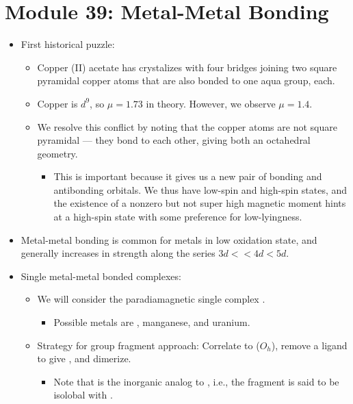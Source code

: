 \documentclass[../notes.tex]{subfiles}
\begin{document}
\section{Module 39: Metal-Metal Bonding}
\begin{itemize}
    \item First historical puzzle:
    \begin{itemize}
        \item Copper (II) acetate has crystalizes with four  bridges joining two square pyramidal copper atoms that are also bonded to one aqua group, each.
        \item Copper is $d^9$, so $\mu=1.73$ in theory. However, we observe $\mu=1.4$.
        \item We resolve this conflict by noting that the copper atoms are not square pyramidal --- they bond to each other, giving both an octahedral geometry.
        \begin{itemize}
            \item This is important because it gives us a new pair of bonding and antibonding orbitals. We thus have low-spin and high-spin states, and the existence of a nonzero but not super high magnetic moment hints at a high-spin state with some preference for low-lyingness.
        \end{itemize}
    \end{itemize}
    \item Metal-metal bonding is common for metals in low oxidation state, and generally increases in strength along the series $3d<<4d<5d$.
    \item Single metal-metal bonded complexes:
    \begin{itemize}
        \item We will consider the paradiamagnetic single  complex .
        \begin{itemize}
            \item Possible metals are , manganese, and uranium.
        \end{itemize}
        \item Strategy for group fragment approach: Correlate to  ($O_h$), remove a ligand to give , and dimerize.
        \begin{itemize}
            \item Note that  is the inorganic analog to , i.e., the  fragment is said to be isolobal with .
        \end{itemize}

\end{itemize}
\end{itemize}
\end{document}
